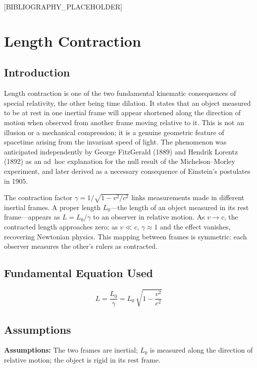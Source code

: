\documentclass[11pt,openright]{book}
\begin{document}
[BIBLIOGRAPHY_PLACEHOLDER]


\chapter{Length Contraction}

\section*{Introduction}

Length contraction is one of the two fundamental kinematic consequences of special relativity, the other being time dilation. It states that an object measured to be at rest in one inertial frame will appear shortened along the direction of motion when observed from another frame moving relative to it. This is not an illusion or a mechanical compression; it is a genuine geometric feature of spacetime arising from the invariant speed of light. The phenomenon was anticipated independently by George FitzGerald (1889) and Hendrik Lorentz (1892) as an ad~hoc explanation for the null result of the Michelson--Morley experiment, and later derived as a necessary consequence of Einstein's postulates in 1905.

The contraction factor $\gamma = 1/\sqrt{1 - v^{2}/c^{2}}$ links measurements made in different inertial frames. A proper length $L_{0}$—the length of an object measured in its rest frame—appears as $L = L_{0}/\gamma$ to an observer in relative motion. As $v \to c$, the contracted length approaches zero; as $v \ll c$, $\gamma \approx 1$ and the effect vanishes, recovering Newtonian physics. This mapping between frames is symmetric: each observer measures the other's rulers as contracted.
\section*{Fundamental Equation Used}

\begin{equation}
\boxed{\; L = \frac{L_{0}}{\gamma} = L_{0}\,\sqrt{1 - \frac{v^{2}}{c^{2}}}\;}
\label{eq:length-contraction}
\end{equation}
\section*{Assumptions}

\textbf{Assumptions:} The two frames are inertial; $L_{0}$ is measured along the direction of relative motion; the object is rigid in its rest frame.
\end{document}
